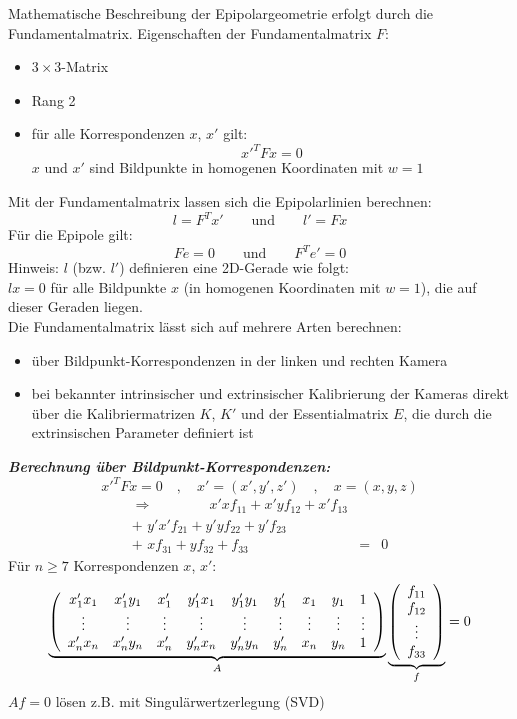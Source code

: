 Mathematische Beschreibung der Epipolargeometrie erfolgt durch die Fundamentalmatrix. Eigenschaften der Fundamentalmatrix $F$:
\begin{itemize}
\item $3 \times 3$-Matrix
\item Rang 2
\item für alle Korrespondenzen $x$, $x'$ gilt: $$x'^TFx = 0$$ $x$ und $x'$ sind Bildpunkte in homogenen Koordinaten mit $w = 1$
\end{itemize}
Mit der Fundamentalmatrix lassen sich die Epipolarlinien berechnen: $$l = F^Tx' \qquad \textrm{und} \qquad l' = Fx$$ Für die Epipole gilt: $$Fe = 0 \qquad \textrm{und} \qquad F^Te' = 0$$ Hinweis: $l$ (bzw. $l'$) definieren eine 2D-Gerade wie folgt: \\ $lx = 0$ für alle Bildpunkte $x$ (in homogenen Koordinaten mit $w = 1$), die auf dieser Geraden liegen. \\
Die Fundamentalmatrix lässt sich auf mehrere Arten berechnen:
\begin{itemize}
\item über Bildpunkt-Korrespondenzen in der linken und rechten Kamera
\item bei bekannter intrinsischer und extrinsischer Kalibrierung der Kameras direkt über die Kalibriermatrizen $K$, $K'$ und der Essentialmatrix $E$, die durch die extrinsischen Parameter definiert ist
\end{itemize}
\textbf{\textsl{Berechnung über Bildpunkt-Korrespondenzen:}}
$$x'^T Fx = 0 \quad , \quad x' = (x',y',z') \quad , \quad x = (x,y,z)$$
\begin{eqnarray*}
\Rightarrow \qquad \qquad x'x f_{11} + x'y f_{12} + x'f_{13} && \\ + \,\, y'x'f_{21} + y'yf_{22} + y'f_{23} && \\ + \,\, xf_{31} + yf_{32} + f_{33} &=& 0
\end{eqnarray*}
Für $n \geq 7$ Korrespondenzen $x$, $x'$:
$$\underbrace{\left( \begin{array}{ccccccccc} x_1'x_1 & x_1'y_1 & x_1' & y_1'x_1 & y_1'y_1 & y_1' & x_1 & y_1 & 1 \\ \vdots & \vdots & \vdots & \vdots & \vdots & \vdots & \vdots & \vdots & \vdots \\ x_n'x_n & x_n'y_n & x_n' & y_n'x_n & y_n'y_n & y_n' & x_n & y_n & 1 \end{array} \right)}_{A} \underbrace{\left( \begin{array}{c} f_{11} \\ f_{12} \\ \vdots \\ f_{33} \end{array} \right)}_{f} = 0$$
$Af=0$ lösen z.B. mit Singulärwertzerlegung (SVD) \\
